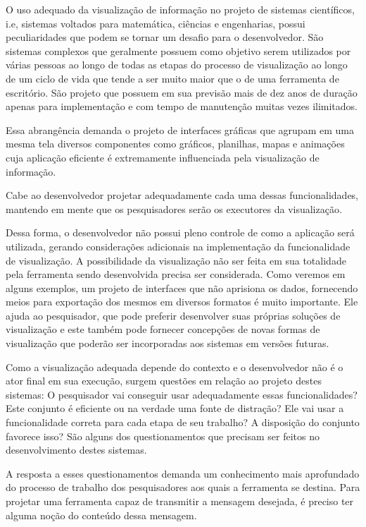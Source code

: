 \documentclass[]{article}
\begin{document}
O uso adequado da visualização de informação no projeto de sistemas científicos, i.e, sistemas voltados para matemática, ciências e engenharias, possui peculiaridades que podem se tornar um desafio para o desenvolvedor. São sistemas complexos que geralmente possuem como objetivo serem utilizados por várias pessoas ao longo de todas as etapas do processo de visualização \cite{Fry:2008:VD:1482332} ao longo de um ciclo de vida que tende a ser muito maior que o de uma ferramenta de escritório. São projeto que possuem em sua previsão mais de dez anos de duração apenas para implementação e com tempo de manutenção muitas vezes ilimitados.

Essa abrangência demanda o projeto de interfaces gráficas que agrupam em uma mesma tela diversos componentes como gráficos, planilhas, mapas e animações cuja aplicação eficiente é extremamente influenciada pela visualização de informação. 

Cabe ao desenvolvedor projetar adequadamente cada uma dessas funcionalidades, mantendo em mente que os pesquisadores serão os executores da visualização.

Dessa forma, o desenvolvedor não possui pleno controle de como a aplicação será utilizada, gerando considerações adicionais na implementação da funcionalidade de visualização. A possibilidade da visualização não ser feita em sua totalidade pela ferramenta sendo desenvolvida precisa ser considerada. Como veremos em alguns exemplos, um projeto de interfaces que não aprisiona os dados, fornecendo meios para exportação dos mesmos em diversos formatos é muito importante. Ele ajuda ao pesquisador, que pode preferir desenvolver suas próprias soluções de visualização e este também pode fornecer concepções de novas formas de visualização que poderão ser incorporadas aos sistemas em versões futuras.

Como a visualização adequada depende do contexto e o desenvolvedor não é o ator final em sua execução,  surgem questões em relação ao projeto destes sistemas: O pesquisador vai conseguir usar adequadamente essas funcionalidades? Este conjunto é eficiente ou na verdade uma fonte de distração? Ele vai usar a funcionalidade correta para cada etapa de seu trabalho? A disposição do conjunto favorece isso? São alguns dos questionamentos que precisam ser feitos no desenvolvimento destes sistemas.

A resposta a esses questionamentos demanda um conhecimento mais aprofundado do processo de trabalho dos pesquisadores aos quais a ferramenta se destina. Para projetar uma ferramenta capaz de transmitir a mensagem desejada, é preciso ter alguma noção do conteúdo dessa mensagem.
\end{document}
